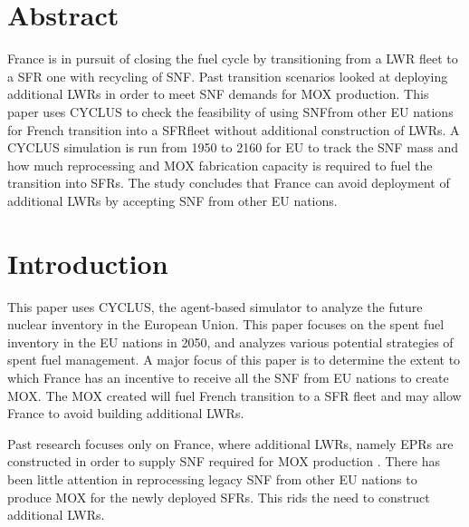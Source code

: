 \section{Abstract}
France is in pursuit of closing the fuel cycle by transitioning from a \gls{LWR} fleet
to a \gls{SFR} one with recycling of \gls{SNF}. Past transition scenarios looked at
deploying additional \glspl{LWR} in order to meet \gls{SNF} demands for \gls{MOX} production.
This paper uses CYCLUS to check the feasibility of using \gls{SNF}from other EU nations
for French transition into a \gls{SFR}fleet without additional construction of \glspl{LWR}.
A CYCLUS simulation is run from 1950 to 2160 for EU to track the \gls{SNF} mass
and how much reprocessing and \gls{MOX} fabrication capacity is required to fuel
the transition into \glspl{SFR}. The study concludes that France can avoid deployment
of additional \glspl{LWR} by accepting \gls{SNF} from other EU nations.


\section{Introduction}
This paper uses CYCLUS, the agent-based simulator \cite{huff_fundamental_2016} to analyze
the future nuclear inventory in the European Union. This paper focuses on the spent fuel
inventory in the EU nations in 2050, and analyzes various potential strategies of spent fuel
management.
A major focus of this paper is to determine the extent to which France has an incentive
to receive all the \gls{SNF} from EU nations to create \gls{MOX}.
The \gls{MOX} created will fuel French transition to a \gls{SFR} fleet
and may allow France to avoid building additional \glspl{LWR}.

Past research focuses only on France, where additional \glspl{LWR},
namely \glspl{EPR} are constructed in order to supply \gls{SNF} required
for \gls{MOX} production \cite{carre_overview_2009, martin_symbiotic_2007, freynet_multiobjective_2016}.
There has been little attention in reprocessing legacy \gls{SNF} from other
EU nations to produce \gls{MOX} for the newly deployed \glspl{SFR}.
This rids the need to construct additional \glspl{LWR}.

